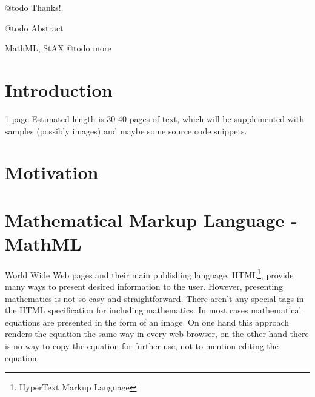 \documentclass[11pt,oneside,final]{fithesis2}
\begin{document}



\FrontMatter
\ThesisTitlePage

\begin{ThesisDeclaration}
\DeclarationText
\AdvisorName
\end{ThesisDeclaration}

\begin{ThesisThanks}
@todo Thanks!
\end{ThesisThanks}

\begin{ThesisAbstract}
@todo Abstract
\end{ThesisAbstract}

\begin{ThesisKeyWords}
MathML, StAX  @todo more
\end{ThesisKeyWords}

\MainMatter
\tableofcontents

\chapter{Introduction}
1 page
Estimated length is 30-40 pages of text, which will be supplemented with samples (possibly images) and maybe some source code snippets.

\chapter{Motivation}

\chapter{Mathematical Markup Language - MathML}
World Wide Web pages and their main publishing language, HTML\footnote{HyperText Markup Language}, provide many ways to present desired information to the user. However, presenting mathematics is not so easy and straightforward. There aren't any special tags in the HTML specification for including mathematics. In most cases mathematical equations are presented in the form of an image. On one hand this approach renders the equation the same way in every web browser, on the other hand there is no way to copy the equation for further use, not to mention editing the equation. 
\end{document}
